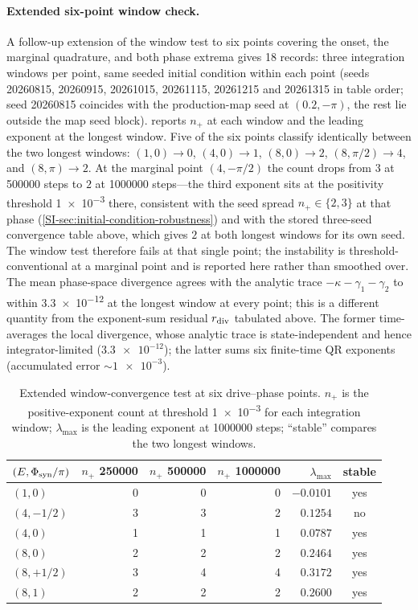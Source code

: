 \documentclass[preprint,numbers,a4paper]{elsarticle}
\begin{document}
\paragraph{Extended six-point window check.}
A follow-up extension of the window test to six points covering the onset, the marginal quadrature, and both phase extrema gives \num{18} records: three integration windows per point, same seeded initial condition within each point (seeds \num{20260815}, \num{20260915}, \num{20261015}, \num{20261115}, \num{20261215} and \num{20261315} in table order; seed \num{20260815} coincides with the production-map seed at $(0.2,-\pi)$, the rest lie outside the map seed block).  reports $n_{+}$ at each window and the leading exponent at the longest window. Five of the six points classify identically between the two longest windows: $(1,0)\to0$, $(4,0)\to1$, $(8,0)\to2$, $(8,\pi/2)\to4$, and $(8,\pi)\to2$. At the marginal point $(4,-\pi/2)$ the count drops from $3$ at \num{500000} steps to $2$ at \num{1000000} steps---the third exponent sits at the positivity threshold \num{1e-3} there, consistent with the seed spread $n_+\in\{2,3\}$ at that phase (\cref{SI-sec:initial-condition-robustness}) and with the stored three-seed convergence table above, which gives $2$ at both longest windows for its own seed. The window test therefore fails at that single point; the instability is threshold-conventional at a marginal point and is reported here rather than smoothed over. The mean phase-space divergence agrees with the analytic trace $-\kappa-\gamma_1-\gamma_2$ to within \num{3.3e-12} at the longest window at every point; this is a different quantity from the exponent-sum residual $r_{\rm div}$ tabulated above. The former time-averages the local divergence, whose analytic trace is state-independent and hence integrator-limited ($\num{3.3e-12}$); the latter sums six finite-time QR exponents (accumulated error $\sim\num{1e-3}$).

\begin{table}[h]
  \centering
  \caption{Extended window-convergence test at six drive--phase points. $n_{+}$ is the positive-exponent count at threshold \num{1e-3} for each integration window; $\lambda_{\max}$ is the leading exponent at \num{1000000} steps; ``stable'' compares the two longest windows.}
  \label{SI-tab:si-convergence-v2}
  \begin{tabular}{@{}lrrrrc@{}}
    \toprule
    $(E,\Phi_{\rm syn}/\pi)$ & $n_{+}$ \num{250000} & $n_{+}$ \num{500000} & $n_{+}$ \num{1000000} & $\lambda_{\max}$ & stable \\
    \midrule
    $(1,0)$ & 0 & 0 & 0 & $\num{-0.0101}$ & yes \\
    $(4,-1/2)$ & 3 & 3 & 2 & $\num{0.1254}$ & no \\
    $(4,0)$ & 1 & 1 & 1 & $\num{0.0787}$ & yes \\
    $(8,0)$ & 2 & 2 & 2 & $\num{0.2464}$ & yes \\
    $(8,+1/2)$ & 3 & 4 & 4 & $\num{0.3172}$ & yes \\
    $(8,1)$ & 2 & 2 & 2 & $\num{0.2600}$ & yes \\
    \bottomrule
  \end{tabular}
\end{table}
\end{document}
